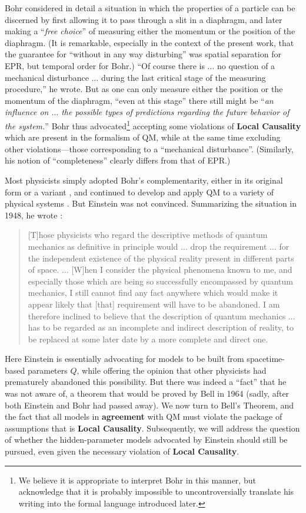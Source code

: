 \documentclass[rmp, aps, preprint, longbibliography]{revtex4-1}
\begin{document}
Bohr considered in detail a situation in which the properties of a particle can be discerned by first allowing it to pass through a slit in a diaphragm, and later making a ``{\it free choice}'' of measuring either the momentum or the position of the diaphragm.  (It is remarkable, especially in the context of the present work, that the guarantee for ``without in any way disturbing'' was spatial separation for EPR, but temporal order for Bohr.)  ``Of course there is $\dots$ no question of a mechanical disturbance $\dots$ during the last critical stage of the measuring procedure,'' he wrote.  But as one can only measure either the position or the momentum of the diaphragm, ``even at this stage'' there still might be ``{\it an influence on $\dots$ the possible types of predictions regarding the future behavior of the system.}''  
Bohr thus advocated\footnote{We believe it is appropriate to interpret Bohr in this manner, but acknowledge that it is probably impossible to uncontroversially translate his writing into the formal language introduced later.} accepting some violations of {\bf Local Causality} which are present in the formalism of QM, while at the same time excluding other violations---those corresponding to a ``mechanical disturbance''.  (Similarly, his notion of ``completeness'' clearly differs from that of EPR.)

Most physicists simply adopted Bohr's complementarity, either in its original form or a variant \cite{bell1992}, and continued to develop and apply QM to a variety of physical systems \cite{bellHoP,mermin1986}. But Einstein was not convinced.  Summarizing the situation in 1948, he wrote \cite{born1971}:
\begin{quote}
[T]hose physicists who regard the descriptive methods of quantum mechanics as definitive in principle would $\dots$ drop the requirement $\dots$ for the independent existence of the physical reality present in different parts of space. $\dots$  [W]hen I consider the physical phenomena known to me, and especially those which are being so successfully encompassed by quantum mechanics, I still cannot find any fact anywhere which would make it appear likely that [that] requirement will have to be abandoned.  I am therefore inclined to believe that the description of quantum mechanics $\dots$ has to be regarded as an incomplete and indirect description of reality, to be replaced at some later date by a more complete and direct one.
\end{quote}
Here Einstein is essentially advocating for models to be built from spacetime-based parameters $Q$, while offering the opinion that other physicists had prematurely abandoned this possibility.  But there was indeed a ``fact'' that he was not aware of, a theorem that would be proved by Bell in 1964 (sadly, after both Einstein and Bohr had passed away).  We now turn to Bell's Theorem, and the fact that all models in {\bf agreement} with QM must violate the package of assumptions that is {\bf Local Causality}.  Subsequently, we will address the question of whether the hidden-parameter models advocated by Einstein should still be pursued, even given the necessary violation of {\bf Local Causality}.
\end{document}
